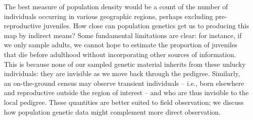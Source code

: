\documentclass{ar-1col}
\begin{document}
The best measure of population density
would be a count of the number of individuals occurring in various geographic regions,
perhaps excluding pre-reproductive juveniles.
How close can population genetics get us to producing this map by indirect means?
Some fundamental limitations are clear:
for instance, 
if we only sample adults,
we cannot hope to estimate the proportion of juveniles that die before adulthood
without incorporating other sources of information.
This is because none of our sampled genetic material inherits from these unlucky individuals:
they are invisible as we move back through the pedigree.
Similarly, an on-the-ground census may observe transient individuals
-- i.e., born elsewhere and reproductive outside the region of interest --
and who are thus invisible to the local pedigree.
These quantities are better suited to field observation;
we discuss how population genetic data might complement more direct observation.


\end{document}
